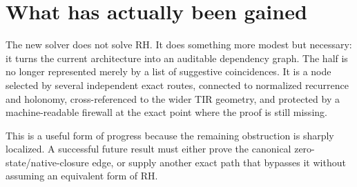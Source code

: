 \section{What has actually been gained}

The new solver does not solve RH.  It does something more modest but necessary:
it turns the current architecture into an auditable dependency graph.  The half
is no longer represented merely by a list of suggestive coincidences.  It is a
node selected by several independent exact routes, connected to normalized
recurrence and holonomy, cross-referenced to the wider TIR geometry, and
protected by a machine-readable firewall at the exact point where the proof is
still missing.

This is a useful form of progress because the remaining obstruction is sharply
localized.  A successful future result must either prove the canonical
zero-state/native-closure edge, or supply another exact path that bypasses it
without assuming an equivalent form of RH.

